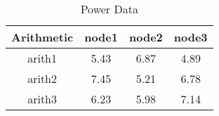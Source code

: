 \begin{table}[h]
\centering
\begin{tabular}{|c|c|c|c|}
\hline
Arithmetic & node1 & node2 & node3\\ \hline
arith1 & 5.43 & 6.87 & 4.89\\ \hline
arith2 & 7.45 & 5.21 & 6.78\\ \hline
arith3 & 6.23 & 5.98 & 7.14\\ \hline
\end{tabular}
\caption{Power Data}
\end{table}
